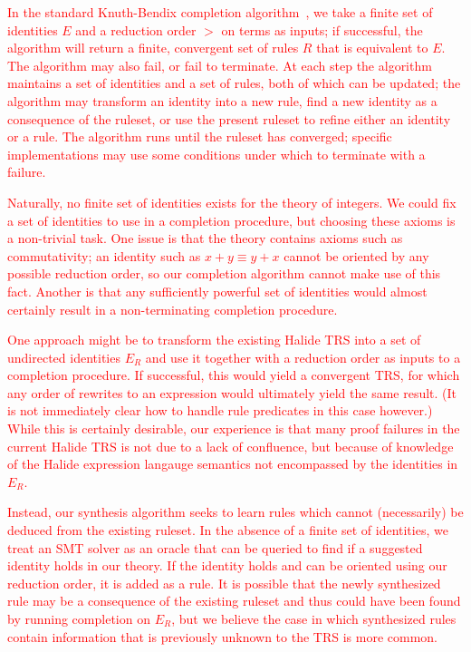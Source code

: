\documentclass[acmsmall,review]{acmart}\settopmatter{printfolios=true,printccs=false,printacmref=false}
\newcommand{\modified}[1]{\textcolor{red}{{#1}}}
\begin{document}
\modified{In the standard Knuth-Bendix completion algorithm~\cite{knuth1983simple}, we take a
finite set of identities $E$ and a reduction order $>$ on terms as inputs; if successful, the
algorithm will return a finite, convergent set of rules $R$ that is equivalent to 
$E$. The algorithm may also fail, or fail to terminate. At each step the algorithm
maintains a set of identities and a set of rules, both of which can be updated; the 
algorithm may transform an identity into a new rule, find a new identity as a 
consequence of the ruleset, or use the present ruleset to refine either an identity 
or a rule. The algorithm runs until the ruleset has converged; specific implementations
may use some conditions under which to terminate with a failure.}

\modified{Naturally, no finite set of identities exists for the theory of integers. We could
fix a set of identities to use in a completion procedure, but choosing these axioms
is a non-trivial task. One issue is that the theory contains axioms such as commutativity;
an identity such as $x + y \equiv y + x$ cannot be oriented by any possible reduction 
order, so our completion algorithm cannot make use of this fact. Another is that any
sufficiently powerful set of identities would almost certainly result in a non-terminating
completion procedure.}

\modified{One approach might be to transform the existing Halide TRS into a set of undirected
identities $E_R$ and use it together with a reduction order as inputs to a completion procedure. 
If successful, this would yield a convergent TRS, for which any order of rewrites to 
an expression would ultimately yield the same result. (It is not immediately clear how 
to handle rule predicates in this case however.) While this is certainly desirable, 
our experience is that many proof failures in the current Halide TRS is not due to a 
lack of confluence, but because of knowledge of the Halide expression langauge semantics 
not encompassed by the identities in $E_R$.}

\modified{Instead, our synthesis algorithm seeks to learn rules which cannot (necessarily) be 
deduced from the existing ruleset. In the absence of a finite set of identities, we 
treat an SMT solver as an oracle that can be queried to find if a suggested identity 
holds in our theory. If the identity holds and can be oriented using our reduction order, 
it is added as a rule. It is possible that the newly synthesized rule may be a consequence 
of the existing ruleset and thus could have been found by running completion on $E_R$, 
but we believe the case in which synthesized rules contain information that is previously 
unknown to the TRS is more common. }
\end{document}
